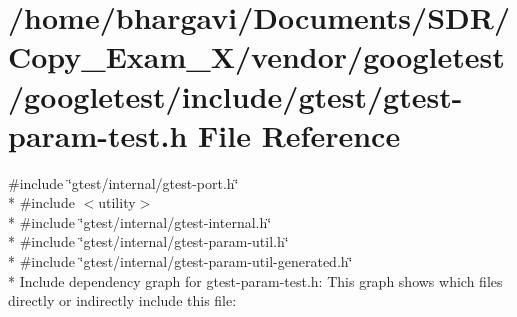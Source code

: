 \hypertarget{gtest-param-test_8h}{}\section{/home/bhargavi/\+Documents/\+S\+D\+R/\+Copy\+\_\+\+Exam\+\_\+X/vendor/googletest/googletest/include/gtest/gtest-\/param-\/test.h File Reference}
\label{gtest-param-test_8h}
{\ttfamily \#include \char`\"{}gtest/internal/gtest-\/port.\+h\char`\"{}}\\*
{\ttfamily \#include $<$utility$>$}\\*
{\ttfamily \#include \char`\"{}gtest/internal/gtest-\/internal.\+h\char`\"{}}\\*
{\ttfamily \#include \char`\"{}gtest/internal/gtest-\/param-\/util.\+h\char`\"{}}\\*
{\ttfamily \#include \char`\"{}gtest/internal/gtest-\/param-\/util-\/generated.\+h\char`\"{}}\\*
Include dependency graph for gtest-\/param-\/test.h\+:
This graph shows which files directly or indirectly include this file\+:
